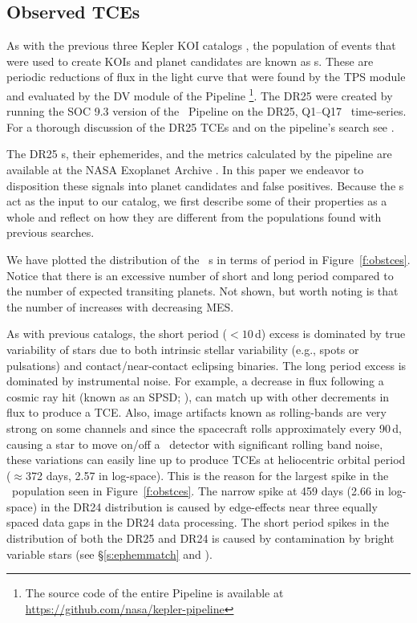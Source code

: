 \subsection{Observed TCEs}

\label{s:tces}
As with the previous three Kepler KOI catalogs \citep{Coughlin2016,Mullally2015cat,Rowe2015cat}, the population of events that were used to create KOIs and planet candidates are known as \opstce s. These are periodic reductions of flux in the light curve that were found by the TPS module and evaluated by the DV module of the \Kepler{} Pipeline \citep{JenkinsKDPH}\footnote{The source code of the entire Pipeline is available at \url{https://github.com/nasa/kepler-pipeline}}. The DR25   were created by running the SOC 9.3 version of the \Kepler\ Pipeline on the DR25, Q1--Q17 \Kepler\ time-series.  For a thorough discussion of the DR25 TCEs and on the pipeline's search see \citet{Twicken2016}. 

The DR25 \opstce s, their ephemerides, and the metrics calculated by the pipeline are available at the NASA Exoplanet Archive \citep{Akeson2013}.  In this paper we endeavor to disposition these signals into planet candidates and false positives.  Because the \opstce s act as the input to our catalog, we first describe some of their properties as a whole and reflect on how they are different from the \opstce{} populations found with previous searches.

We have plotted the distribution of the \ntcesnorogue\ \opstce s in terms of period in Figure~\ref{f:obstces}. Notice that there is an excessive number of short and long period  compared to the number of expected transiting planets. Not shown, but worth noting is that the number of  increases with decreasing MES.

As with previous catalogs, the short period ($<10$\,d) excess is dominated by true variability of stars due to both intrinsic stellar variability (e.g., spots or pulsations) and contact/near-contact eclipsing binaries. The long period excess is dominated by instrumental noise. For example, a decrease in flux following a cosmic ray hit (known as an SPSD; \citealt{KDCH}), can match up with other decrements in flux to produce a TCE. Also, image artifacts known as rolling-bands are very strong on some channels \citep[see \S6.7 of][]{KIH}  and since the spacecraft rolls approximately every 90\,d, causing a star to move on/off a \Kepler\ detector with significant rolling band noise, these variations can easily line up to produce TCEs at  heliocentric orbital period ($\approx$372 days, 2.57 in log-space). This is the reason for the largest spike in the \opstce\ population seen in Figure~\ref{f:obstces}. The narrow spike at 459 days (2.66 in log-space) in the DR24 \opstce{} distribution is caused by edge-effects near three equally spaced data gaps in the DR24 data processing.  The short period spikes in the distribution of both the DR25 and DR24  is caused by contamination by bright variable stars (see \S\ref{s:ephemmatch} and \citealt{Coughlin2014a}).

